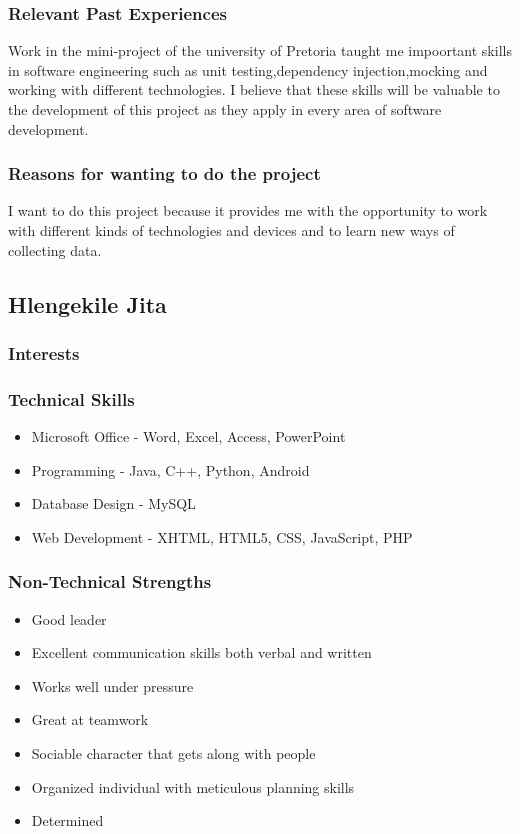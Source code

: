 \documentclass[a4paper,12pt]{article}
\begin{document}
\subsubsection{Relevant Past Experiences}
Work in the mini-project of the university of Pretoria taught me impoortant skills in software engineering such as unit testing,dependency injection,mocking and working with different technologies. I believe that these skills will be valuable to the development of this project as they apply in every area of software development.
\subsubsection{Reasons for wanting to do the project}
I want to do this project because it provides me with the opportunity to work with different kinds of technologies and devices and to learn new ways of collecting data.
\subsection{Hlengekile Jita}
\subsubsection{Interests}
\subsubsection{Technical Skills}
\begin{itemize}
\item Microsoft Office - Word, Excel, Access, PowerPoint
\item Programming - Java, C++, Python, Android
\item Database Design - MySQL
\item Web Development - XHTML, HTML5, CSS, JavaScript, PHP
\end{itemize}
\subsubsection{Non-Technical Strengths}
\begin{itemize}
\item Good leader
\item Excellent communication skills both verbal and written
\item Works well under pressure
\item Great at teamwork
\item Sociable character that gets along with people
\item Organized individual with meticulous planning skills
\item Determined
\end{itemize}
\end{document}
